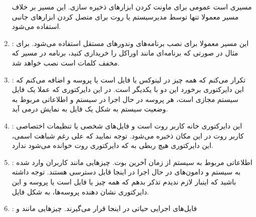 \begin{enumerate}
مسیری است عمومی برای ماونت کردن ابزارهای ذخیره سازی. این مسیر بر خلاف مسیر 
 معمولا تنها توسط مدیرسیستم یا روت برای متصل کردن ابزارهای جانبی استفاده می‌شود.
\item {\large{}}:
این مسیر معمولا برای نصب برنامه‌های وندورهای مستقل استفاده می‌شود. برای مثال در صورتی که برنامه‌ای مانند اوراکل را خریداری کنید، برنامه در مسیر 
 که مخفف کلمات 
 است نصب خواهد شد.
\item {\large{}}:
تکرار می‌کنم که همه چیز در لینوکس یا فایل است یا پروسه و اضافه می‌کنم که این دایرکتوری برخورد این دو با یکدیگر است. در این دایرکتوری که عملا یک فایل سیستم مجازی است، هر پروسه در حال اجرا در سیستم و اطلاعاتی مربوط به وضعیت سیستم به شکل یک فایل به نمایش درمی آید.
\item {\large{}}:
این دایرکتوری خانه کاربر روت است و فایل‌های شخصی یا تنظیمات اختصاصی کاربر روت در این مکان ذخیره می‌شود. توجه نمایید که علی رغم شباهت اسمی، این دایرکتوری هیچ ربطی به
\lr{/}
 که دایرکتوری روت خوانده می‌شود ندارد.
\item {\large{}}:
اطلاعاتی مربوط به سیستم از زمان آخرین بوت. چیزهایی مانند کاربران وارد شده به سیستم و دامون‌های در حال اجرا در اینجا قابل دسترسی هستند. توجه داشته باشید که اینبار لازم ندیدم تذکر بدهم که همه چیز یا فایل است یا پروسه و این دایرکتوری نشان دهنده پروسه‌ها، به شکل فایل.
\item {\large{}}:
فایل‌های اجرایی حیاتی در اینجا قرار می‌گیرند. چیزهایی مانند 
 و 


\end{enumerate}
